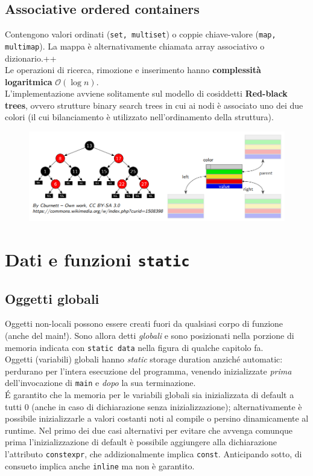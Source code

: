 \documentclass[10pt, oneside]{book}
\begin{document}
\section{Associative ordered containers}
Contengono valori ordinati (\texttt{set, multiset}) o coppie chiave-valore (\texttt{map, multimap}). La mappa è alternativamente chiamata array associativo o dizionario.++\\
Le operazioni di ricerca, rimozione e inserimento hanno \textbf{complessità logaritmica} $\mathcal{O}(\log n)$.\\
L'implementazione avviene solitamente sul modello di cosiddetti \textbf{Red-black trees}, ovvero strutture binary search trees in cui ai nodi è associato uno dei due colori (il cui bilanciamento è utilizzato nell'ordinamento della struttura).
\begin{figure}[h!]
\centering
\includegraphics[scale=0.8]{map.png}
\end{figure}

\chapter{Dati e funzioni \texttt{static}}

\section{Oggetti globali}
Oggetti non-locali possono essere creati fuori da qualsiasi corpo di funzione (anche del main!). Sono allora detti \textit{globali} e sono posizionati nella porzione di memoria indicata con \texttt{static data} nella figura di qualche capitolo fa.\\
Oggetti (variabili) globali hanno \textit{static} storage duration anziché automatic: perdurano per l'intera esecuzione del programma, venendo inizializzate \textit{prima} dell'invocazione di \texttt{main} e \textit{dopo} la sua terminazione.\\
\'E garantito che la memoria per le variabili globali sia inizializzata di default a tutti 0 (anche in caso di dichiarazione senza inizializzazione); alternativamente è possibile inizializzarle a valori costanti noti al compile o persino dinamicamente al runtime. Nel primo dei due casi alternativi per evitare che avvenga comunque prima l'inizializzazione di default è possibile aggiungere alla dichiarazione l'attributo \texttt{constexpr}, che addizionalmente implica \texttt{const}. Anticipando sotto, di consueto implica anche \texttt{inline} ma non è garantito.
\end{document}
